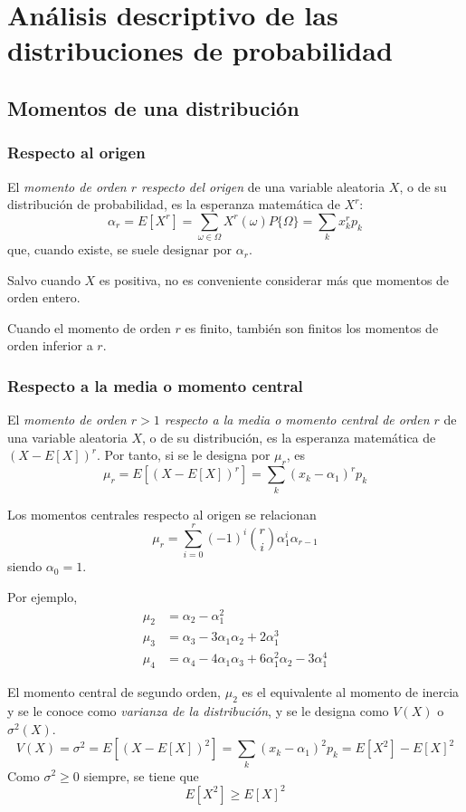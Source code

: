 \chapter{Análisis descriptivo de las distribuciones de probabilidad}

\section{Momentos de una distribución}

\subsection{Respecto al origen}

El \emph{momento de orden $r$ respecto del origen} de una variable aleatoria $X$, o de su distribución de probabilidad, es la esperanza matemática de $X^r$:
\[
\alpha_r = E[X^r] = \sum_{\omega \in \Omega} X^r(\omega)P\{\Omega\} = \sum_k x_k^r p_k
\]
que, cuando existe, se suele designar por $\alpha_r$.

Salvo cuando $X$ es positiva, no es conveniente considerar más que momentos de orden entero.

Cuando el momento de orden $r$ es finito, también son finitos los momentos de orden inferior a $r$.

\subsection{Respecto a la media o momento central} 

El \emph{momento de orden $r > 1$ respecto a la media o momento central de orden $r$} de una variable aleatoria $X$, o de su distribución, es la esperanza matemática de $(X-E[X])^r$. Por tanto, si se le designa por $\mu_r$, es
\[
\mu_r = E[(X-E[X])^r] = \sum_k (x_k -\alpha_1)^r p_k
\]

Los momentos centrales respecto al origen se relacionan
\[
\mu_r = \sum_{i=0}^r (-1)^i \binom{r}{i}\alpha_1^i\alpha_{r-1}
\]
siendo $\alpha_0 = 1$.

Por ejemplo,
\begin{align*}
    \mu_2 &= \alpha_2 - \alpha_1^2 \\
    \mu_3 &= \alpha_3 - 3\alpha_1\alpha_2 + 2\alpha_1^3 \\
    \mu_4 &= \alpha_4 - 4 \alpha_1\alpha_3 + 6\alpha_1^2\alpha_2 - 3\alpha_1^4
\end{align*}

El momento central de segundo orden, $\mu_2$ es el equivalente al momento de inercia y se le conoce como \emph{varianza de la distribución}, y se le designa como $V(X)$ o $\sigma^2(X)$.
\[
V(X) = \sigma^2 = E[(X-E[X])^2] = \sum_k (x_k - \alpha_1)^2p_k = E[X^2] - E[X]^2
\]
Como $\sigma^2 \geq 0$ siempre, se tiene que
\[
E[X^2] \geq E[X]^2
\]


